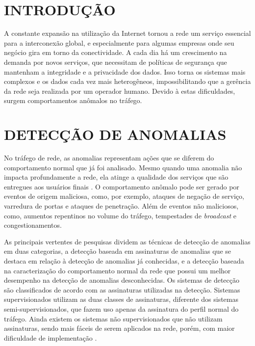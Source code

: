 \documentclass[article,12pt,oneside,a4paper,english,brazil]{unifil}
\begin{document}
\textual
\fontsize{12}{7}\selectfont
\begin{Spacing}{1.5}

\section*{INTRODUÇÃO}

A constante expansão na utilização da Internet tornou a rede um serviço essencial para a interconexão global, e especialmente para algumas empresas onde seu negócio gira em torno da conectividade. A cada dia há um crescimento na demanda por novos serviços, que necessitam de políticas de segurança que mantenham a integridade e a privacidade dos dados. Isso torna os sistemas mais complexos e os dados cada vez mais heterogêneos, impossibilitando que a gerência da rede seja realizada por um operador humano. Devido à estas dificuldades, surgem comportamentos anômalos no tráfego.

\section*{DETECÇÃO DE ANOMALIAS}

No tráfego de rede, as anomalias representam ações que se diferem do comportamento normal que já foi analisado. Mesmo quando uma anomalia não impacta profundamente a rede, ela atinge a qualidade dos serviços que são entregues aos usuários finais \cite{Lakhina2004}. O comportamento anômalo pode ser gerado por eventos de origem maliciosa, como, por exemplo, ataques de negação de serviço, varredura de portas e ataques de penetração. Além de eventos não maliciosos, como, aumentos repentinos no volume do tráfego, tempestades de \textit{broadcast} e congestionamentos.

As principais vertentes de pesquisas dividem as técnicas de detecção de anomalias em duas categorias, a detecção baseada em assinaturas de anomalias que se destaca em relação à detecção de anomalias já conhecidas, e a detecção baseada na caracterização do comportamento normal da rede que possui um melhor desempenho na detecção de anomalias desconhecidas. Os sistemas de detecção são classificados de acordo com as assinaturas utilizadas na detecção. Sistemas supervisionados utilizam as duas classes de assinaturas, diferente dos sistemas semi-supervisionados, que fazem uso apenas da assinatura do perfil normal do tráfego. Ainda existem os sistemas não supervisionados que não utilizam assinaturas, sendo mais fáceis de serem aplicados na rede, porém, com maior dificuldade de implementação \cite{chandola2009}.


\end{Spacing}
\end{document}
